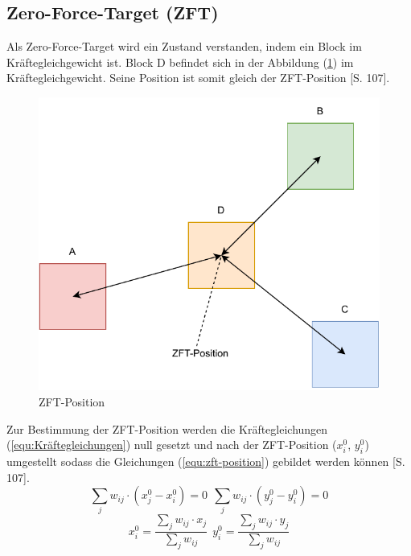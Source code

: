         \subsection{Zero-Force-Target (ZFT)}
            Als Zero-Force-Target wird ein Zustand verstanden, indem ein Block im Kräftegleichgewicht ist.
            Block D befindet sich in der Abbildung (\ref{fig:zft-position}) im Kräftegleichgewicht.
            Seine Position ist somit gleich der ZFT-Position \cite{layout}[S. 107].
            \begin{figure}[H]
                \centering
                \includegraphics[scale=0.75]{img/zft.pdf}
                \caption{ZFT-Position}
                \label{fig:zft-position}
            \end{figure}
            Zur Bestimmung der ZFT-Position werden die Kräftegleichungen (\ref{equ:Kräftegleichungen})
            null gesetzt und nach der ZFT-Position ($x_i^0$, $y_i^0$) umgestellt sodass
            die Gleichungen (\ref{equ:zft-position}) gebildet werden können \cite{layout}[S. 107].
            \begin{equation}
                \label{equ:Kräftegleichungen}
                \sum_{j} w_{ij} \cdot (x_j^0-x_i^0) = 0~~
                \sum_{j} w_{ij} \cdot (y_j^0-y_i^0) = 0
            \end{equation}
            \begin{equation}
                \label{equ:zft-position}
                x_i^0 = \frac{\sum_{j} w_{ij} \cdot x_j}{\sum_{j} w_{ij}}~~
                y_i^0 = \frac{\sum_{j} w_{ij} \cdot y_j}{\sum_{j} w_{ij}}
            \end{equation}

